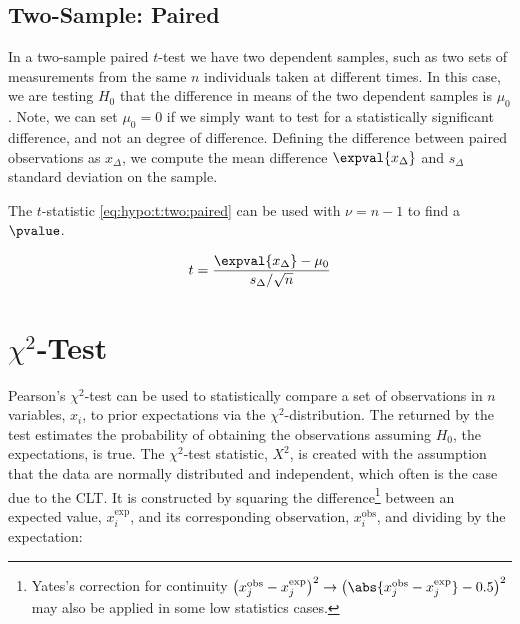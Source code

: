 \subsection{Two-Sample: Paired}
\label{hypo:t_test:two:paired}

In a two-sample paired $t$-test we have two dependent samples,
such as two sets of measurements from the same $n$ individuals taken at different times.
In this case, we are testing $H_{0}$ that the difference in means of the two dependent samples is $\mu_{0}$.
Note, we can set $\mu_{0} = 0$ if we simply want to test for a statistically significant difference, and not an \apriori degree of difference.
Defining the difference between paired observations as $x_{\Delta}$, we compute the mean difference $\expval{x_{\Delta}}$ and $s_{\Delta}$ standard deviation on the sample.

The $t$-statistic \cref{eq:hypo:t:two:paired} can be used with $\nu = n-1$ to find a $\pvalue$.

\begin{equation}\label{eq:hypo:t:two:paired}
t = \frac{\expval{x_{\Delta}} - \mu_{0}}{s_{\Delta} / \sqrt{n}}
\end{equation}

\section{\texorpdfstring{$\chi^{2}$-Test}{Chi-Squared Test}}
\label{hypo:chi2_test}

Pearson's $\chi^{2}$-test can be used to
statistically compare a set of observations in
$n$ variables, $x_{i}$, to prior expectations via the $\chi^{2}$-distribution.
The \pvalue returned by the test estimates the probability of obtaining the observations
assuming $H_{0}$, \ie the expectations, is true.
The $\chi^{2}$-test statistic, $X^{2}$, is created with the assumption that
the data are normally distributed and independent,
which often is the case due to the CLT.
It is constructed by squaring the difference\footnote{Yates's
correction for continuity $\left(x^{\text{obs}}_{j} - x^{\text{exp}}_{j}\right)^{2} \to \left(\abs{x^{\text{obs}}_{j} - x^{\text{exp}}_{j}}-0.5\right)^{2}$ may
also be applied in some low statistics cases.} between
an expected value, $x^{\text{exp}}_{i}$, and its corresponding observation, $x^{\text{obs}}_{i}$,
and dividing by the expectation:

